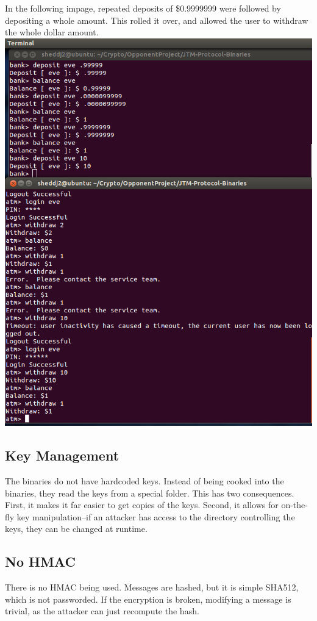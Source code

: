 \documentclass{article}
\begin{document}
In the following impage, repeated deposits of \$0.9999999 were followed by depositing a whole amount. This rolled it over, and allowed the user to withdraw the whole dollar amount.
\\
\includegraphics[scale=0.65]{StrangeFloatBehavior.png}
\\

\subsection{Key Management}
The binaries do not have hardcoded keys. Instead of being cooked into the binaries, they read the keys from a special folder. This has two consequences. First, it makes it far easier to get copies of the keys. Second, it allows for on-the-fly key manipulation--if an attacker has access to the directory controlling the keys, they can be changed at runtime.

\subsection{No HMAC}
There is no HMAC being used. Messages are hashed, but it is simple SHA512, which is not passworded. If the encryption is broken, modifying a message is trivial, as the attacker can just recompute the hash.
\end{document}
